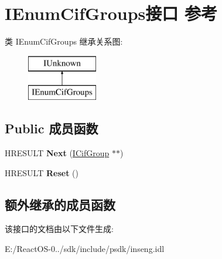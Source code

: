 \hypertarget{interface_i_enum_cif_groups}{}\section{I\+Enum\+Cif\+Groups接口 参考}
\label{interface_i_enum_cif_groups}
类 I\+Enum\+Cif\+Groups 继承关系图\+:\begin{figure}[H]
\begin{center}
\leavevmode
\includegraphics[height=2.000000cm]{interface_i_enum_cif_groups}
\end{center}
\end{figure}
\subsection*{Public 成员函数}
\begin{DoxyCompactItemize}
\item 
\mbox{\label{interface_i_enum_cif_groups_affcdeb2a6edde27b17267501a9b3c2e6}} 
H\+R\+E\+S\+U\+LT {\bfseries Next} (\hyperlink{interface_i_cif_group}{I\+Cif\+Group} $\ast$$\ast$)
\item 
\mbox{\label{interface_i_enum_cif_groups_a3624de0eaaa7e451eebb64f8b06b69b1}} 
H\+R\+E\+S\+U\+LT {\bfseries Reset} ()
\end{DoxyCompactItemize}
\subsection*{额外继承的成员函数}


该接口的文档由以下文件生成\+:\begin{DoxyCompactItemize}
\item 
E\+:/\+React\+O\+S-\/0../sdk/include/psdk/inseng.\+idl\end{DoxyCompactItemize}
